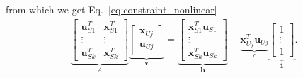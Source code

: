 \documentclass[%
preprint,
 amsmath,amssymb,
 aps,
]{revtex4-1}
\begin{document}
from which we get Eq.~\ref{eq:constraint_nonlinear}
\begin{align*}
\underbrace{
	\begin{bmatrix}
	\bm{u}_{S1}^T & \bm{x}_{S1}^T\\
	\vdots & \vdots\\
	\bm{u}_{Sk}^T & \bm{x}_{Sk}^T
	\end{bmatrix}
}_{A}
\underbrace{
	\begin{bmatrix}
	\bm{x}_{Uj} \\ 
	\bm{u}_{Uj}
	\end{bmatrix}
}_{\bm{v}}
=
\underbrace{
	\begin{bmatrix} 
	\bm{x}_{S1}^T\bm{u}_{S1}\\ 
	\vdots\\
	\bm{x}_{Sk}^T\bm{u}_{Sk}
	\end{bmatrix}
}_{\bm{b}}
+
\underbrace{
	\bm{x}_{Uj}^T\bm{u}_{Uj}
}_{c}
\underbrace{
	\begin{bmatrix}
	1\\
	\vdots\\
	1
	\end{bmatrix}
}_{\bm{1}}.
\end{align*}
\end{document}
